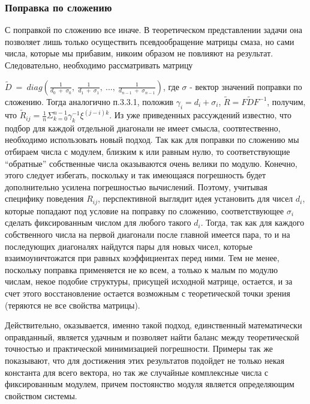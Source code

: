 \documentclass[a4paper]{article}
\theoremstyle{definition}
\begin{document}
    \subsubsection{Поправка по сложению}


    С поправкой по сложению все иначе. В теоретическом представлении задачи она позволяет лишь только осуществить псевдообращение матрицы смаза, но сами числа, которые мы прибавим, никоим образом не повлияют на результат. Следовательно, необходимо рассматривать матрицу

$\tilde{D}~=~diag(\frac{1}{d_0~+~\sigma_0},~\frac{1}{d_1~+~\sigma_1},~...,~\frac{1}{d_{n-1}~+~\sigma_{n-1}})$, где $\sigma$ - вектор значений поправки по сложению. Тогда аналогично п.3.3.1, положив $\gamma_i = d_i + \sigma_i$, $\tilde{R} = F\tilde{D}F^{-1}$, получим, что $\tilde{R}_{ij} = \frac{1}{n}\Sigma_{k=0}^{n-1} \gamma_k^{-1} \xi^{(j-i)k}$. Из уже приведенных рассуждений известно, что подбор для каждой отдельной диагонали не имеет смысла, соотвтественно, необходимо использовать новый подход. Так как для поправки по сложению мы отбираем числа с модулем, близким к или равным нулю, то соответствующие ``обратные'' собственные числа оказываются очень велики по модулю. Конечно, этого следует избегать, поскольку и так имеющаяся погрешность будет дополнительно усилена погрешностью вычислений. Поэтому, учитывая специфику поведения $R_{ij}$, перспективной выглядит идея установить для чисел $d_i$, которые попадают под условие на поправку по сложению, соответствующее $\sigma_i$ сделать фиксированным числом для любого такого $d_i$. Тогда, так как для каждого собственного числа на первой диагонали после главной имеется пара, то и на последующих диагоналях найдутся пары для новых чисел, которые взаимоуничтожатся при равных коэффициентах перед ними.  Тем не менее, поскольку поправка применяется не ко всем, а только к малым по модулю числам, некое подобие структуры, присущей исходной матрице, остается, и за счет этого восстановление остается возможным с теоретической точки зрения (теряются не все свойства матрицы).


    Действительно, оказывается, именно такой подход, единственный математически оправданный, является удачным и позволяет найти баланс между теоретической точностью и практической минимизацией погрешности. Примеры так же показывают, что для достижения этих результатов подойдет не только некая константа для всего вектора, но так же случайные комплексные числа с фиксированным модулем, причем постоянство модуля является определяющим свойством системы.
\end{document}
